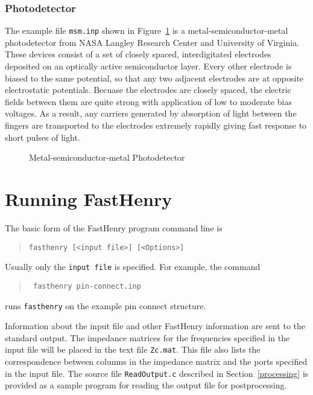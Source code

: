 \subsubsection{Photodetector}

The example file {\tt msm.inp} shown in Figure~\ref{msm} is a
metal-semiconductor-metal photodetector from NASA Langley Research
Center and University of Virginia.  These devices consist of a set of
closely spaced, interdigitated electrodes deposited on an optically
active semiconductor layer.  Every other electrode is biased to the
same potential, so that any two adjacent electrodes are at opposite
electrostatic potentials.  Becuase the electrodes are closely spaced,
the electric fields between them are quite strong with application of
low to moderate bias voltages. As a result, any carriers generated by
absorption of light between the fingers are transported to the
electrodes extremely rapidly giving fast response to short pulses of
light.

\begin{figure}
\centerline{
}
\caption{Metal-semiconductor-metal Photodetector}
\label{msm}
\end{figure}

\section{Running FastHenry}

The basic form of the FastHenry program command line is
\begin{quote}
\begin{verbatim}
fasthenry [<input file>] [<Options>]
\end{verbatim}
\end{quote}
Usually only the {\tt input file} is specified.
For example, the command
\begin{quote}\tt
fasthenry pin-connect.inp
\end{quote}
runs {\tt fasthenry} on the example pin connect structure.

Information about the input file and other FastHenry information are
sent to the standard output.  The impedance matrices for the
frequencies specified in the input file will be placed in the text
file {\tt Zc.mat}.  This file also lists the correspondence between
columns in the impedance matrix and the ports specified in the input
file.  The source file {\tt ReadOutput.c} described in
Section~\ref{processing} is provided as a sample program for reading
the output file for postprocessing.

